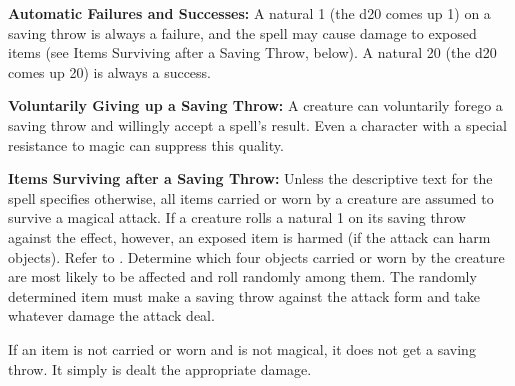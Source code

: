 \textbf{Automatic Failures and Successes:} A natural 1 (the d20 comes up 1) on a saving throw is always a failure, and the spell may cause damage to exposed items (see Items Surviving after a Saving Throw, below). A natural 20 (the d20 comes up 20) is always a success.

\textbf{Voluntarily Giving up a Saving Throw:} A creature can voluntarily forego a saving throw and willingly accept a spell's result. Even a character with a special resistance to magic can suppress this quality.

\textbf{Items Surviving after a Saving Throw:} Unless the descriptive text for the spell specifies otherwise, all items carried or worn by a creature are assumed to survive a magical attack. If a creature rolls a natural 1 on its saving throw against the effect, however, an exposed item is harmed (if the attack can harm objects). Refer to . Determine which four objects carried or worn by the creature are most likely to be affected and roll randomly among them. The randomly determined item must make a saving throw against the attack form and take whatever damage the attack deal.

If an item is not carried or worn and is not magical, it does not get a saving throw. It simply is dealt the appropriate damage.

